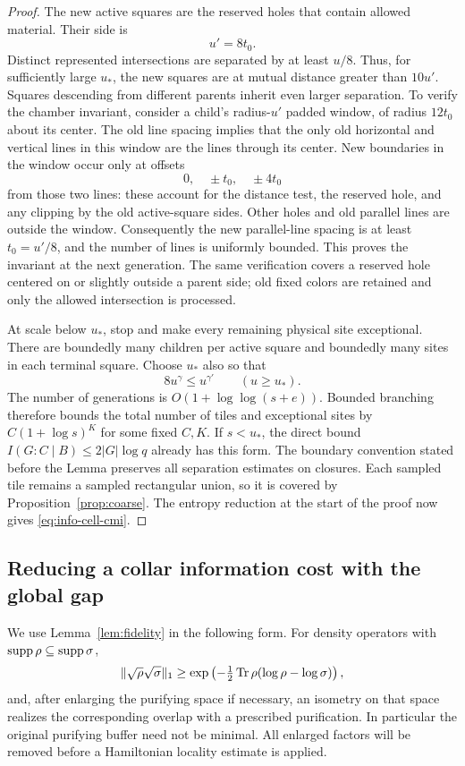 \begin{proof}
The new active squares are the reserved holes that contain allowed
material.  Their side is
\[
 u'=8t_0.
\]
Distinct represented intersections are separated by at least $u/8$.
Thus, for sufficiently large $u_*$, the new squares are at mutual
distance greater than $10u'$.  Squares descending from different
parents inherit even larger separation.  To verify the chamber
invariant, consider a child's radius-$u'$ padded window, of radius
$12t_0$ about its center.  The old line spacing implies that the only
old horizontal and vertical lines in this window are the lines through
its center.  New boundaries in the window occur only at offsets
\[
 0,\quad \pm t_0,\quad \pm4t_0
\]
from those two lines: these account for the distance test, the reserved
hole, and any clipping by the old active-square sides.  Other holes
and old parallel lines are outside the window.  Consequently the new
parallel-line spacing is at least $t_0=u'/8$, and the number of lines
is uniformly bounded.  This proves the invariant at the next generation.
The same verification covers a reserved hole centered on or slightly
outside a parent side; old fixed colors are retained and only the
allowed intersection is processed.

At scale below $u_*$, stop and make every remaining physical site
exceptional.  There are boundedly many children per active square and
boundedly many sites in each terminal square.  Choose $u_*$ also so that
\[
 8u^\gamma\le u^{\gamma'}\qquad(u\ge u_*).
\]
The number of generations is $O(1+\log\log(s+e))$.  Bounded branching
therefore bounds the total number of tiles and exceptional sites by
$C(1+\log s)^K$ for some fixed $C,K$.  If $s<u_*$, the direct bound
$I(G:C\mid B)\le2|G|\log q$ already has this form.  The boundary
convention stated before the Lemma preserves all separation estimates
on closures.  Each sampled tile remains a sampled rectangular union,
so it is covered by Proposition~\ref{prop:coarse}.  The entropy reduction
at the start of the proof now gives \eqref{eq:info-cell-cmi}.
\end{proof}

\subsection{Reducing a collar information cost with the global gap}

We use Lemma~\ref{lem:fidelity} in the following form.  For density
operators with $\operatorname{supp}\rho\subseteq\operatorname{supp}\sigma$,
\begin{equation}
 \lVert \sqrt\rho\sqrt\sigma\rVert_1
 \ge \exp\left(-\tfrac12\operatorname{Tr}\rho(\log\rho-\log\sigma)\right),
 \label{eq:info-relative-entropy-overlap}
\end{equation}
and, after enlarging the purifying space if necessary, an isometry on
that space realizes the corresponding overlap with a prescribed
purification.  In particular the original purifying buffer need not
be minimal.  All enlarged factors will be removed before a Hamiltonian
locality estimate is applied.

